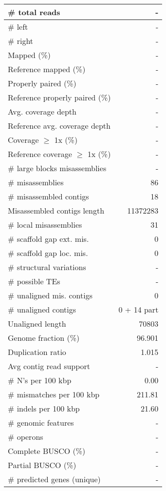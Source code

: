 \documentclass[12pt,a4paper]{article}
\begin{document}
\begin{table}[ht]
\begin{center}
\begin{tabular}{|l*{1}{|r}|}
\# total reads & - \\ \hline
\# left & - \\ \hline
\# right & - \\ \hline
Mapped (\%) & - \\ \hline
Reference mapped (\%) & - \\ \hline
Properly paired (\%) & - \\ \hline
Reference properly paired (\%) & - \\ \hline
Avg. coverage depth & - \\ \hline
Reference avg. coverage depth & - \\ \hline
Coverage $\geq$ 1x (\%) & - \\ \hline
Reference coverage $\geq$ 1x (\%) & - \\ \hline
\# large blocks misassemblies & - \\ \hline
\# misassemblies & 86 \\ \hline
\# misassembled contigs & 18 \\ \hline
Misassembled contigs length & 11372283 \\ \hline
\# local misassemblies & 31 \\ \hline
\# scaffold gap ext. mis. & 0 \\ \hline
\# scaffold gap loc. mis. & 0 \\ \hline
\# structural variations & - \\ \hline
\# possible TEs & - \\ \hline
\# unaligned mis. contigs & 0 \\ \hline
\# unaligned contigs & 0 + 14 part \\ \hline
Unaligned length & 70803 \\ \hline
Genome fraction (\%) & 96.901 \\ \hline
Duplication ratio & 1.015 \\ \hline
Avg contig read support & - \\ \hline
\# N's per 100 kbp & 0.00 \\ \hline
\# mismatches per 100 kbp & 211.81 \\ \hline
\# indels per 100 kbp & 21.60 \\ \hline
\# genomic features & - \\ \hline
\# operons & - \\ \hline
Complete BUSCO (\%) & - \\ \hline
Partial BUSCO (\%) & - \\ \hline
\# predicted genes (unique) & - \\ \hline

\end{tabular}
\end{center}
\end{table}
\end{document}

